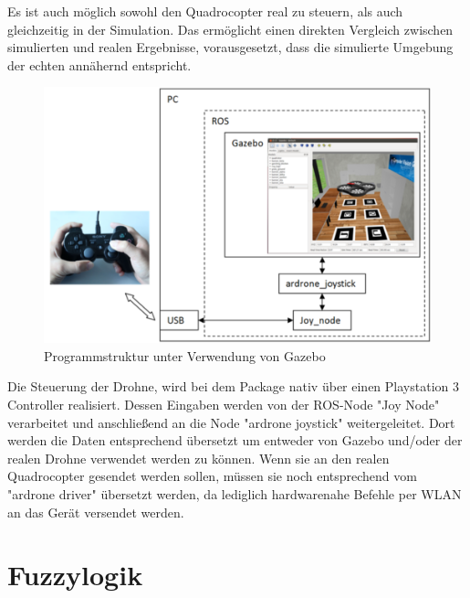  Es ist auch möglich sowohl den Quadrocopter real zu steuern, als auch gleichzeitig in der Simulation. Das ermöglicht einen direkten Vergleich zwischen simulierten und realen Ergebnisse, vorausgesetzt, dass die simulierte Umgebung der echten annähernd entspricht.
  \begin{figure}[ht]
  	\centering
  	\includegraphics[scale=1.0]{Bilder/sim_structure.png}
  	\caption[Programmstruktur unter Verwendung von Gazebo]{Programmstruktur unter Verwendung von Gazebo \cite{sim_structure}}
  	
  \end{figure} %
Die Steuerung der Drohne, wird bei dem Package nativ über einen Playstation 3 Controller realisiert. Dessen Eingaben werden von der ROS-Node "Joy Node" verarbeitet und anschließend an die Node "ardrone joystick" weitergeleitet. Dort werden die Daten entsprechend übersetzt um entweder von Gazebo und/oder der realen Drohne verwendet werden zu können. Wenn sie an den realen Quadrocopter gesendet werden sollen, müssen sie noch entsprechend vom "ardrone driver" übersetzt werden, da lediglich hardwarenahe Befehle per WLAN an das Gerät versendet werden. 
\section{Fuzzylogik}
